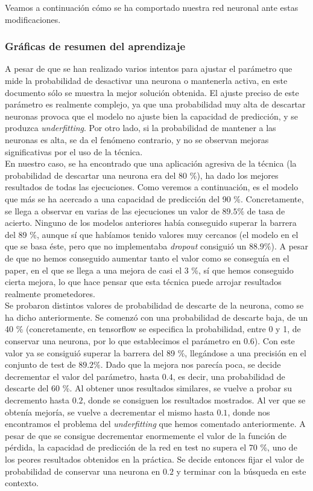 \documentclass[11pt]{article}
\theoremstyle{plain}
\theoremstyle{definition}
\begin{document}
Veamos a continuación cómo se ha comportado nuestra red neuronal ante
estas modificaciones.

\subsubsection{Gráficas de resumen del aprendizaje}

A pesar de que se han realizado varios intentos para ajustar el
parámetro que mide la probabilidad de desactivar una neurona o
mantenerla activa, en este documento sólo se muestra la mejor solución
obtenida. El ajuste preciso de este parámetro es realmente complejo,
ya que una probabilidad muy alta de descartar neuronas provoca que el
modelo no ajuste bien la capacidad de predicción, y se produzca
\textit{underfitting}. Por otro lado, si la probabilidad de mantener a
las neuronas es alta, se da el fenómeno contrario, y no se observan
mejoras significativas por el uso de la técnica.\\

En nuestro caso, se ha encontrado que una aplicación agresiva de la
técnica (la probabilidad de descartar una neurona era del 80 \%), ha
dado los mejores resultados de todas las ejecuciones. Como veremos a
continuación, es el modelo que más se ha acercado a una capacidad de
predicción del 90 \%. Concretamente, se llega a observar en varias de
las ejecuciones un valor de $89.5 \%$ de tasa de acierto. Ninguno de
los modelos anteriores había conseguido superar la barrera del 89 \%,
aunque sí que habíamos tenido valores muy cercanos (el modelo en el
que se basa éste, pero que no implementaba \textit{dropout} consiguió
un $88.9 \%$). A pesar de que no hemos conseguido aumentar tanto el
valor como se conseguía en el paper, en el que se llega a una mejora
de casi el 3 \%, sí que hemos conseguido cierta mejora, lo que hace
pensar que esta técnica puede arrojar resultados realmente
prometedores.\\

Se probaron distintos valores de probabilidad de descarte de la
neurona, como se ha dicho anteriormente. Se comenzó con una
probabilidad de descarte baja, de un 40 \% (concretamente, en
tensorflow se especifica la probabilidad, entre 0 y 1, de conservar
una neurona, por lo que establecimos el parámetro en $0.6$). Con este
valor ya se consiguió superar la barrera del 89 \%, llegándose a una
precisión en el conjunto de test de $89.2 \%$. Dado que la mejora nos
parecía poca, se decide decrementar el valor del parámetro, hasta
$0.4$, es decir, una probabilidad de descarte del 60 \%. Al obtener
unos resultados similares, se vuelve a probar su decremento hasta
$0.2$, donde se consiguen los resultados mostrados. Al ver que se
obtenía mejoría, se vuelve a decrementar el mismo hasta $0.1$, donde
nos encontramos el problema del \textit{underfitting} que hemos
comentado anteriormente. A pesar de que se consigue decrementar
enormemente el valor de la función de pérdida, la capacidad de
predicción de la red en test no supera el 70 \%, uno de los peores
resultados obtenidos en la práctica. Se decide entonces fijar el valor
de probabilidad de conservar una neurona en $0.2$ y terminar con la
búsqueda en este contexto.
\end{document}
